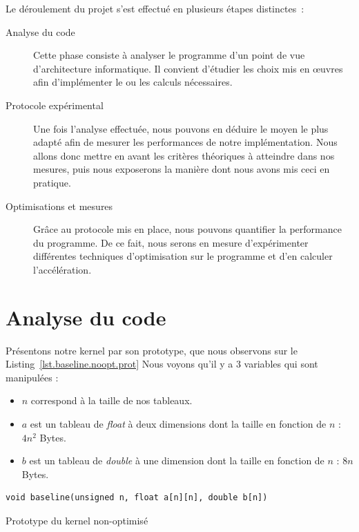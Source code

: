\documentclass[12pt,a4paper]{article}
\begin{document}
Le déroulement du projet s'est effectué en plusieurs étapes distinctes :
\begin{description}
    \item[Analyse du code] Cette phase consiste à analyser le programme d'un
        point de vue d'architecture informatique. Il convient d'étudier les
        choix mis en œuvres afin d'implémenter le ou les calculs nécessaires.
    \item[Protocole expérimental] Une fois l'analyse effectuée, nous
        pouvons en déduire le moyen le plus adapté afin de mesurer les
        performances de notre implémentation. Nous allons donc mettre en
        avant les critères théoriques à atteindre dans nos mesures, puis
        nous exposerons la manière dont nous avons mis ceci en pratique.
    \item[Optimisations et mesures] Grâce au protocole mis en place, nous
        pouvons quantifier la performance du programme. De ce fait, nous serons
        en mesure d'expérimenter différentes techniques d'optimisation sur le
        programme et d'en calculer l'accélération.
\end{description}

\section{Analyse du code}

Présentons notre kernel par son prototype, que nous observons sur le
Listing~\ref{lst.baseline.noopt.prot} Nous voyons qu’il y a 3 variables qui sont manipulées :
\begin{itemize}
    \item $n$ correspond à la taille de nos tableaux.
    \item $a$ est un tableau de \textit{float} à deux dimensions dont la taille
        en fonction de $n$ : $4n^2$ Bytes.
    \item $b$ est un tableau de \textit{double} à une dimension dont la taille
        en fonction de $n$ : $8n$ Bytes.
\end{itemize}

\begin{listing}[ht]
    \begin{verbatim}
void baseline(unsigned n, float a[n][n], double b[n])
    \end{verbatim}
    \caption{Prototype du kernel non-optimisé}
    \label{lst.baseline.noopt.prot}
\end{listing}
\end{document}
